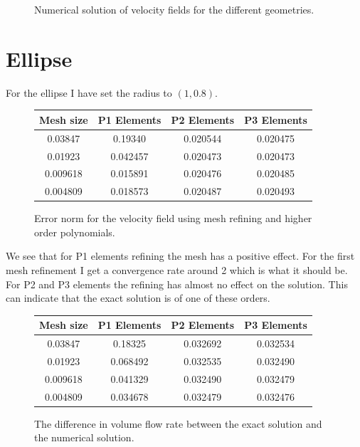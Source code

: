 \documentclass[11pt]{report}
\begin{document}
\begin{figure}[htb]
\begin{subfigure}{.3\textwidth}
\end{subfigure}
\caption{Numerical solution of velocity fields for the different geometries.}
\end{figure}



\section*{Ellipse}

For the ellipse I have set the radius to $(1, 0.8)$.
\begin{figure}[htb]
\begin{center}
\begin{tabular}{|c|c|c|c|}
\hline
Mesh size & P1 Elements & P2 Elements & P3 Elements \\ \hline
0.03847 & 0.19340  & 0.020544 & 0.020475         \\ \hline
0.01923 & 0.042457 & 0.020473 & 0.020473           \\ \hline
0.009618 & 0.015891 & 0.020476 & 0.020485           \\ \hline
0.004809 & 0.018573 & 0.020487 & 0.020493           \\ \hline
\end{tabular}
\end {center}
\caption{Error norm for the velocity field using mesh refining and higher order polynomials.}
\end{figure}

We see that for P1 elements refining the mesh has a positive effect. For the first mesh refinement I get a convergence rate around 2 which is what it should be. For P2 and P3 elements the refining has almost no effect on the solution. This can indicate that the exact solution is of one of these orders. 

\begin{figure}[htb]
\begin{center}
\begin{tabular}{|c|c|c|c|}
\hline
Mesh size & P1 Elements & P2 Elements & P3 Elements \\ \hline
0.03847 & 0.18325  & 0.032692 & 0.032534         \\ \hline
0.01923 & 0.068492 & 0.032535 & 0.032490           \\ \hline
0.009618 & 0.041329 & 0.032490 & 0.032479           \\ \hline
0.004809 & 0.034678 & 0.032479 & 0.032476           \\ \hline
\end{tabular}
\end {center}
\caption{The difference in volume flow rate between the exact solution and the numerical solution.}
\end{figure}
\end{document}
